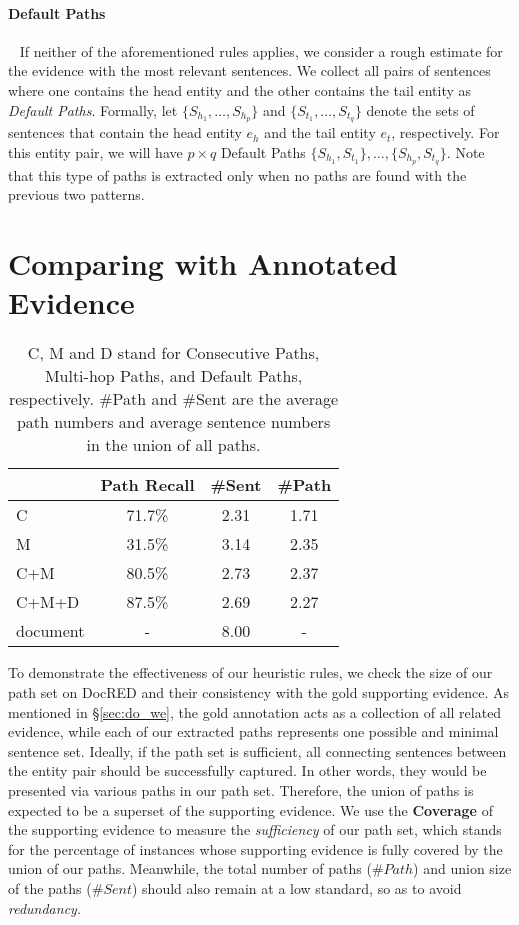 \documentclass[11pt,a4paper]{article}
\begin{document}
\paragraph{Default Paths}~ If neither of the aforementioned rules applies, we consider a rough estimate for the evidence with the most relevant sentences. 
We collect all pairs of sentences where one contains the head entity and the other contains the tail entity as \textit{Default Paths}. Formally, let $\{S_{h_1}, …, S_{h_p}\}$ and $\{S_{t_1}, …, S_{t_q}\}$  denote the sets of sentences that contain the head entity $e_h$ and the tail entity $e_t$, respectively. For this entity pair, we will have $p \times q$ Default Paths $\{S_{h_1}, S_{t_1}\}, …, \{S_{h_p}, S_{t_q}\}$. 
Note that this type of paths is extracted only when no paths are found with the previous two patterns. 

\section{Comparing with Annotated Evidence}

\begin{table}[]
\centering
\small
\setlength{\tabcolsep}{11pt}
\begin{tabular}{lccc}
\toprule 
      & Path Recall & \#Sent & \#Path \\ \midrule
C       & 71.7\%   & 2.31 & 1.71                \\
M       & 31.5\%    & 3.14  & 2.35                      \\
C+M     & 80.5\%    & 2.73  & 2.37                      \\
C+M+D   & 87.5\%    & 2.69 & 2.27                      \\ \midrule
document    & -    & 8.00   & -                  \\ \bottomrule
\end{tabular}
\caption{
C, M and D stand for Consecutive Paths, Multi-hop Paths, and Default Paths, respectively. \#Path and \#Sent are the average path numbers and average sentence numbers in the union of all paths.
} 
\label{tab:overlap}
\vspace{-0.25cm}
\end{table}

To demonstrate the effectiveness of our heuristic rules, we check the size of our path set on DocRED and their consistency with the gold supporting evidence. As mentioned in \S\ref{sec:do_we}, the gold annotation acts as a collection of all related evidence, while each of our extracted paths represents one possible and minimal sentence set. Ideally, if the path set is sufficient, all connecting sentences between the entity pair should be successfully captured. In other words, they would be presented via various paths in our path set. Therefore, the union of paths is expected to be a superset of the supporting evidence. We use the \textbf{Coverage} of the supporting evidence to measure the \textit{sufficiency} of our path set, which stands for the percentage of instances whose supporting evidence is fully covered by the union of our paths. Meanwhile, the total number of paths ($\#Path$) and union size of the paths ($\#Sent$) should also remain at a low standard, so as to avoid \textit{redundancy}.
\end{document}

